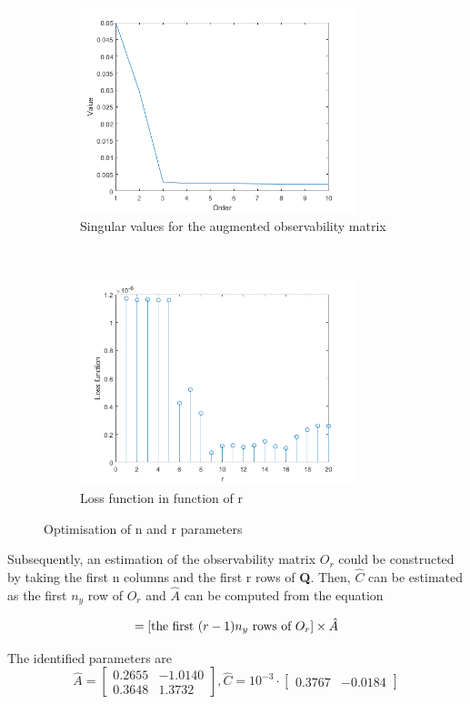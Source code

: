 \documentclass[a4paper,11pt]{article}
\begin{document}
\begin{figure}[H]
\centering
\begin{subfigure}[t]{0.4\textwidth}
\centering
\includegraphics[height = 6cm]{images/Q_svd}
\caption{Singular values for the augmented observability matrix}
\label{fig:Q_svd}
\end{subfigure}
~
\begin{subfigure}[t]{0.4\textwidth}
\centering
\includegraphics[height = 6cm]{images/r}
\caption{Loss function in function of r}
\label{fig:r}
\end{subfigure}
\caption{Optimisation of n and r parameters}
\label{fig:optimize_nr}
\end{figure}

Subsequently, an estimation of the observability matrix $O_r$ could be constructed by taking the first n columns and the first r rows of \textbf{Q}. Then, $\hat{C}$ can be estimated as the first $n_y$ row of $O_r$ and $\hat{A}$ can be computed from the equation

\begin{equation}
[\textnormal{the last $(r-1)n_y$ rows of $O_r$} ]=[\textnormal{the first $(r-1)n_y$ rows of $O_r$} ] \times \hat{A}
\end{equation}

The identified parameters are
\begin{equation}
\hat{A}=\begin{bmatrix}
0.2655 &  -1.0140 \\
0.3648 &  1.3732
\end{bmatrix}
 ,
 \hat{C} =10^{-3}\cdot\begin{bmatrix}
 0.3767 &  -0.0184
 \end{bmatrix}
\end{equation}
\end{document}

